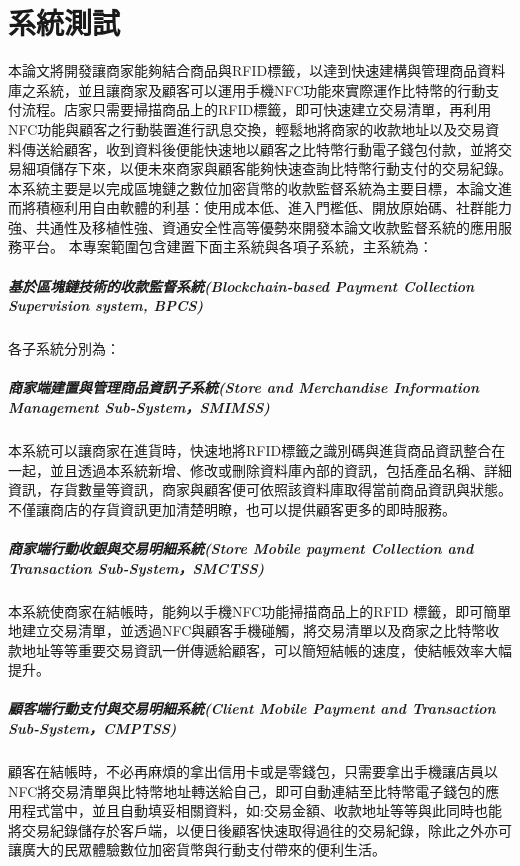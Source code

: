 
\chapter{系統測試}

本論文將開發讓商家能夠結合商品與RFID標籤，以達到快速建構與管理商品資料庫之系統，並且讓商家及顧客可以運用手機NFC功能來實際運作比特幣的行動支付流程。店家只需要掃描商品上的RFID標籤，即可快速建立交易清單，再利用NFC功能與顧客之行動裝置進行訊息交換，輕鬆地將商家的收款地址以及交易資料傳送給顧客，收到資料後便能快速地以顧客之比特幣行動電子錢包付款，並將交易細項儲存下來，以便未來商家與顧客能夠快速查詢比特幣行動支付的交易紀錄。
本系統主要是以完成區塊鏈之數位加密貨幣的收款監督系統為主要目標，本論文進而將積極利用自由軟體的利基：使用成本低、進入門檻低、開放原始碼、社群能力強、共通性及移植性強、資通安全性高等優勢來開發本論文收款監督系統的應用服務平台。
本專案範圍包含建置下面主系統與各項子系統，主系統為：
		\paragraph{基於區塊鏈技術的收款監督系統(Blockchain-based Payment Collection Supervision system, BPCS)}

各子系統分別為：
 		\paragraph{商家端建置與管理商品資訊子系統(Store and Merchandise Information Management Sub-System，SMIMSS)}本系統可以讓商家在進貨時，快速地將RFID標籤之識別碼與進貨商品資訊整合在一起，並且透過本系統新增、修改或刪除資料庫內部的資訊，包括產品名稱、詳細資訊，存貨數量等資訊，商家與顧客便可依照該資料庫取得當前商品資訊與狀態。不僅讓商店的存貨資訊更加清楚明瞭，也可以提供顧客更多的即時服務。
 		\paragraph{商家端行動收銀與交易明細系統(Store Mobile payment Collection and Transaction Sub-System，SMCTSS)}本系統使商家在結帳時，能夠以手機NFC功能掃描商品上的RFID 標籤，即可簡單地建立交易清單，並透過NFC與顧客手機碰觸，將交易清單以及商家之比特幣收款地址等等重要交易資訊一併傳遞給顧客，可以簡短結帳的速度，使結帳效率大幅提升。 
 		\paragraph{顧客端行動支付與交易明細系統(Client Mobile Payment and Transaction Sub-System，CMPTSS)}顧客在結帳時，不必再麻煩的拿出信用卡或是零錢包，只需要拿出手機讓店員以NFC將交易清單與比特幣地址轉送給自己，即可自動連結至比特幣電子錢包的應用程式當中，並且自動填妥相關資料，如:交易金額、收款地址等等與此同時也能將交易紀錄儲存於客戶端，以便日後顧客快速取得過往的交易紀錄，除此之外亦可讓廣大的民眾體驗數位加密貨幣與行動支付帶來的便利生活。

